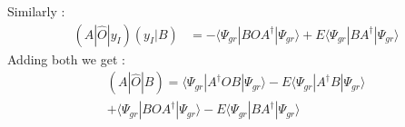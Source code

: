 \documentclass[11pt, oneside]{article}   	%
\begin{document}
    Similarly :
    \begin{equation*}\label{2ndhalf}
      \begin{aligned}
	(A|\hat{O}|y_I)(y_I|B)&=-\big \langle \Psi_{gr}|B O A^\dagger|\Psi_{gr} \big \rangle + E \big \langle \Psi_{gr}|B A^\dagger |\Psi_{gr} \big \rangle
      \end{aligned}
    \end{equation*}
    Adding both we get :
    \begin{equation*}\label{not imp}
      \begin{aligned}
      (A|\hat{O}|B)=\big \langle \Psi_{gr}|A^\dagger O B|\Psi_{gr} \big \rangle - E \big \langle \Psi_{gr}|A^\dagger B|\Psi_{gr} \big \rangle\\
	 + \big \langle \Psi_{gr}|B O A^\dagger |\Psi_{gr} \big \rangle - E \big \langle \Psi_{gr}|B A^\dagger |\Psi_{gr} \big \rangle
      \end{aligned}
    \end{equation*}
\end{document}
